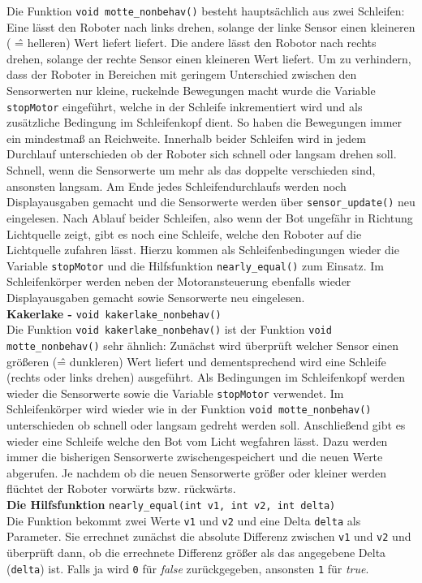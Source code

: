 Die Funktion \verb+void motte_nonbehav()+ besteht hauptsächlich aus zwei Schleifen: Eine lässt den Roboter nach links drehen, solange der linke Sensor einen kleineren ( \^= helleren) Wert liefert liefert. Die andere lässt den Robotor nach rechts drehen, solange der rechte Sensor einen kleineren Wert liefert. Um zu verhindern, dass der Roboter in Bereichen mit geringem Unterschied zwischen den Sensorwerten nur kleine, ruckelnde Bewegungen macht wurde die Variable \verb+stopMotor+ eingeführt, welche in der Schleife inkrementiert wird und als zusätzliche Bedingung im Schleifenkopf dient. So haben die Bewegungen immer ein mindestmaß an Reichweite.
Innerhalb beider Schleifen wird in jedem Durchlauf unterschieden ob der Roboter sich schnell oder langsam drehen soll. Schnell, wenn die Sensorwerte um mehr als das doppelte verschieden sind, ansonsten langsam.
Am Ende jedes Schleifendurchlaufs werden noch Displayausgaben gemacht und die Sensorwerte werden über \verb+sensor_update()+ neu eingelesen.
Nach Ablauf beider Schleifen, also wenn der Bot ungefähr in Richtung Lichtquelle zeigt, gibt es noch eine Schleife, welche den Roboter auf die Lichtquelle zufahren lässt. Hierzu kommen als Schleifenbedingungen wieder die Variable \verb+stopMotor+ und die Hilfsfunktion \verb+nearly_equal()+ zum Einsatz. Im Schleifenkörper werden neben der Motoransteuerung ebenfalls wieder Displayausgaben gemacht sowie Sensorwerte neu eingelesen.\\

\noindent \textbf{Kakerlake - }\verb+void kakerlake_nonbehav()+\\

Die Funktion \verb+void kakerlake_nonbehav()+ ist der Funktion \verb+void motte_nonbehav()+ sehr ähnlich:
Zunächst wird überprüft welcher Sensor einen größeren (\^= dunkleren) Wert liefert und dementsprechend wird eine Schleife (rechts oder links drehen) ausgeführt. Als Bedingungen im Schleifenkopf werden wieder die Sensorwerte sowie die Variable \verb+stopMotor+ verwendet. Im Schleifenkörper wird wieder wie in der Funktion \verb+void motte_nonbehav()+ unterschieden ob schnell oder langsam gedreht werden soll.
Anschließend gibt es wieder eine Schleife welche den Bot vom Licht wegfahren lässt. Dazu werden immer die bisherigen Sensorwerte zwischengespeichert und die neuen Werte abgerufen. Je nachdem ob die neuen Sensorwerte größer oder kleiner werden flüchtet der Roboter vorwärts bzw. rückwärts.\\

\noindent \textbf{Die Hilfsfunktion }\verb+nearly_equal(int v1, int v2, int delta)+\\

Die Funktion bekommt zwei Werte \verb+v1+ und \verb+v2+ und eine Delta \verb+delta+ als Parameter. Sie errechnet zunächst die absolute Differenz zwischen  \verb+v1+ und \verb+v2+ und überprüft dann, ob die errechnete Differenz größer als das angegebene Delta (\verb+delta+) ist. Falls ja wird \verb+0+ für \textit{false} zurückgegeben, ansonsten \verb+1+ für \textit{true}.

